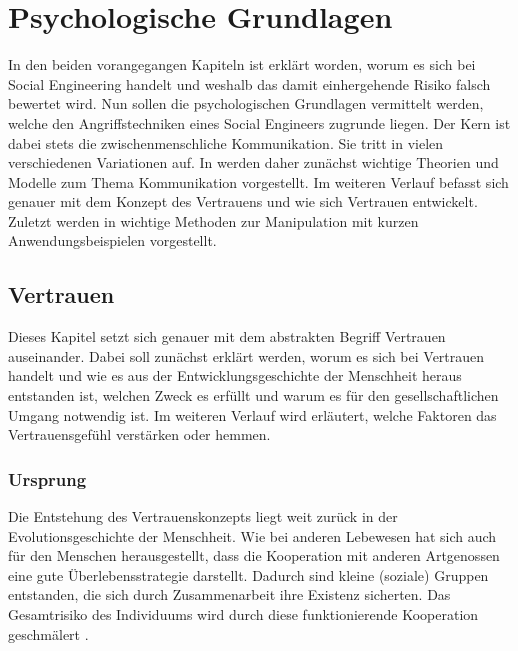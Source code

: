 \section{Psychologische Grundlagen}\label{sec:psychologische_grundlagen}

In den beiden vorangegangen Kapiteln ist erklärt worden, worum es sich bei Social Engineering handelt und weshalb das damit einhergehende Risiko falsch bewertet wird.
Nun sollen die psychologischen Grundlagen vermittelt werden, welche den Angriffstechniken eines Social Engineers zugrunde liegen.
Der Kern ist dabei stets die zwischenmenschliche Kommunikation.
Sie tritt in vielen verschiedenen Variationen auf.
In  werden daher zunächst wichtige Theorien und Modelle zum Thema Kommunikation vorgestellt.
Im weiteren Verlauf befasst sich  genauer mit dem Konzept des Vertrauens und wie sich Vertrauen entwickelt.
Zuletzt werden in  wichtige Methoden zur Manipulation mit kurzen Anwendungsbeispielen vorgestellt.

\subsection{Vertrauen}\label{sec:vertrauen}
Dieses Kapitel setzt sich genauer mit dem abstrakten Begriff Vertrauen auseinander.
Dabei soll zunächst erklärt werden, worum es sich bei Vertrauen handelt und wie es aus der Entwicklungsgeschichte der Menschheit heraus entstanden ist, welchen Zweck es erfüllt und warum es für den gesellschaftlichen Umgang notwendig ist.
Im weiteren Verlauf wird erläutert, welche Faktoren das Vertrauensgefühl verstärken oder hemmen.

\subsubsection{Ursprung}\label{sec:ursprung}
Die Entstehung des Vertrauenskonzepts liegt weit zurück in der Evolutionsgeschichte der Menschheit.
Wie bei anderen Lebewesen hat sich auch für den Menschen herausgestellt, dass die Kooperation mit anderen Artgenossen eine gute Überlebensstrategie darstellt.
Dadurch sind kleine (soziale) Gruppen entstanden, die sich durch Zusammenarbeit ihre Existenz sicherten.
Das Gesamtrisiko des Individuums wird durch diese funktionierende Kooperation geschmälert \citep{liars-and-outliers}.

